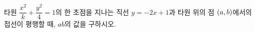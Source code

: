 타원 $\dfrac{x^2}{k}+\dfrac{y^2}{4}=1$의 한 초점을 지나는 직선 $y=-2x+1$과 타원 위의 점 $(a{,}\mkern3mu\mathopen{}b)$에서의 접선이 평행할 때, $ab$의 값을 구하시오. 
